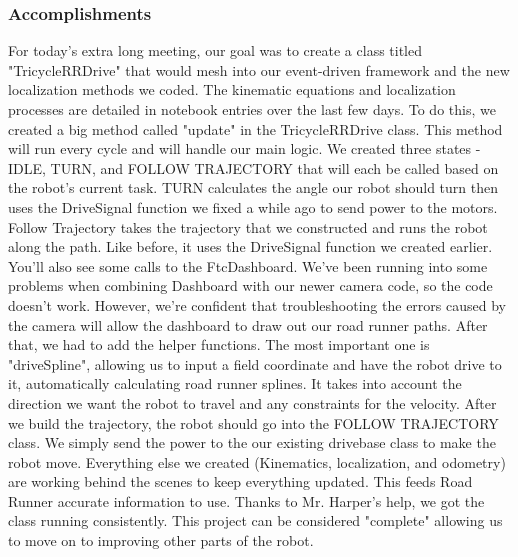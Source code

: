 \subsubsection*{Accomplishments}
For today's extra long meeting, our goal was to create a class titled "TricycleRRDrive" that would mesh into our event-driven framework and the new localization methods we coded. The kinematic equations and localization processes are detailed in notebook entries over the last few days. 
To do this, we created a big method called "update" in the TricycleRRDrive class. This method will run every cycle and will handle our main logic. We created three states - IDLE, TURN, and FOLLOW TRAJECTORY that will each be called based on the robot's current task. TURN calculates the angle our robot should turn then uses the DriveSignal function we fixed a while ago to send power to the motors. Follow Trajectory takes the trajectory that we constructed and runs the robot along the path. Like before, it uses the DriveSignal function we created earlier. You'll also see some calls to the FtcDashboard. We've been running into some problems when combining Dashboard with our newer camera code, so the code doesn't work. However, we're confident that troubleshooting the errors caused by the camera will allow the dashboard to draw out our road runner paths. 
After that, we had to add the helper functions. The most important one is "driveSpline", allowing us to input a field coordinate and have the robot drive to it, automatically calculating road runner splines. It takes into account the direction we want the robot to travel and any constraints for the velocity. After we build the trajectory, the robot should go into the FOLLOW TRAJECTORY class. We simply send the power to the our existing drivebase class to make the robot move. Everything else we created (Kinematics, localization, and odometry) are working behind the scenes to keep everything updated. This feeds Road Runner accurate information to use. 
Thanks to Mr. Harper's help, we got the class running consistently. This project can be considered "complete" allowing us to move on to improving other parts of the robot. 
 
